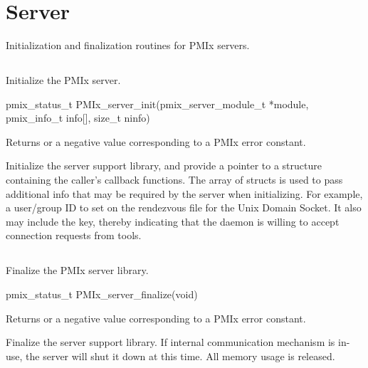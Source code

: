 \section{Server}
\label{chap:api_init:server}

Initialization and finalization routines for \ac{PMIx} servers.

\subsection{}

\summary

Initialize the \ac{PMIx} server.

\format

\cspecificstart
\begin{codepar}
pmix_status_t
PMIx_server_init(pmix_server_module_t *module,
                 pmix_info_t info[], size_t ninfo)
\end{codepar}
\cspecificend

\begin{arglist}
\end{arglist}

Returns  or a negative value corresponding to a PMIx error constant.

\descr

Initialize the server support library, and provide a pointer to a  structure containing the caller's callback functions.
The array of  structs is used to pass additional info that may be required by the server when initializing.
For example, a user/group ID to set on the rendezvous file for the Unix Domain Socket.
It also may include the  key, thereby indicating that the daemon is willing to accept connection requests from tools.


\subsection{}

\summary

Finalize the PMIx server library.

\format

\cspecificstart
\begin{codepar}
pmix_status_t
PMIx_server_finalize(void)
\end{codepar}
\cspecificend

Returns  or a negative value corresponding to a PMIx error constant.

\descr

Finalize the server support library.
If internal communication mechanism is in-use, the server will shut it down at this time.
All memory usage is released.


